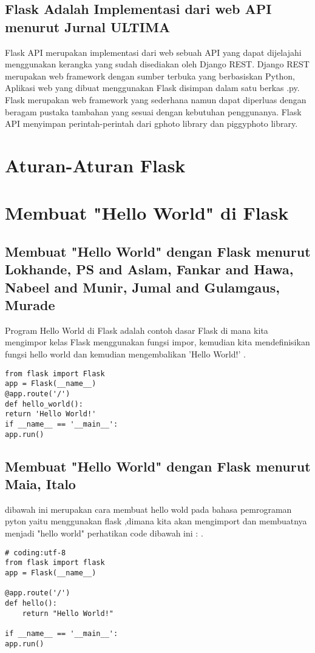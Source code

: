 \documentclass[12pt]{article}
\begin{document}
\subsection{Flask Adalah Implementasi dari web API menurut Jurnal ULTIMA}
Flask API merupakan implementasi dari web sebuah API yang dapat dijelajahi menggunakan kerangka yang sudah disediakan oleh Django REST. Django REST merupakan web framework dengan sumber terbuka yang berbasiskan Python, Aplikasi web yang dibuat menggunakan Flask disimpan dalam satu berkas .py. Flask merupakan web framework yang sederhana namun dapat diperluas dengan beragam pustaka tambahan yang sesuai dengan kebutuhan penggunanya. Flask API menyimpan perintah-perintah dari gphoto library dan piggyphoto library\cite{computingaplikasi}. 

\section{Aturan-Aturan Flask}

 
 
\section{Membuat "Hello World" di Flask}
\subsection{Membuat "Hello World" dengan Flask menurut Lokhande, PS and Aslam, Fankar and Hawa, Nabeel and Munir, Jumal and Gulamgaus, Murade}
Program Hello World di Flask adalah contoh dasar Flask di mana kita mengimpor kelas Flask menggunakan fungsi impor, kemudian kita mendefinisikan fungsi hello world dan kemudian mengembalikan 'Hello World!' \cite{lokhande2015efficient}.
\begin{verbatim}
from flask import Flask
app = Flask(__name__)
@app.route('/')
def hello_world():
return 'Hello World!'
if __name__ == '__main__':
app.run()
\end{verbatim}

\subsection{Membuat "Hello World" dengan Flask menurut Maia, Italo}
dibawah ini merupakan cara membuat hello wold pada bahasa pemrograman pyton yaitu menggunakan flask ,dimana kita akan mengimport dan membuatnya menjadi "hello world" perhatikan code dibawah ini :
\cite{maia2015building}.
\begin{verbatim}
# coding:utf-8
from flask import flask 
app = Flask(__name__)

@app.route('/')
def hello():
	return "Hello World!"
	
if __name__ == '__main__':
app.run()
\end{verbatim}
\end{document}
